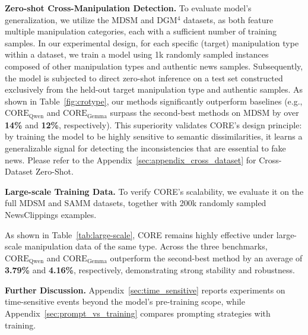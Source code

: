 \documentclass{article}
\theoremstyle{plain}
\theoremstyle{definition}
\theoremstyle{remark}
\begin{document}
\noindent\textbf{Zero-shot Cross-Manipulation Detection.} 
To evaluate model's generalization, we utilize the MDSM and DGM$^4$ datasets, as both feature multiple manipulation categories, each with a sufficient number of training samples. In our experimental design, for each specific (target) manipulation type within a dataset, we train a model using 1k randomly sampled instances composed of other manipulation types and authentic news samples. Subsequently, the model is subjected to direct zero-shot inference on a test set constructed exclusively from the held-out target manipulation type and authentic samples. As shown in Table~\ref{fig:crotype}, our methods significantly outperform baselines (e.g., $\text{CORE}_\text{Qwen}$ and $\text{CORE}_\text{Gemma}$ surpass the second-best methods on MDSM by over \textbf{14\%} and \textbf{12\%}, respectively). This superiority validates CORE's design principle: by training the model to be highly sensitive to semantic dissimilarities, it learns a generalizable signal for detecting the inconsistencies that are essential to fake news. Please refer to the Appendix~\ref{sec:appendix_cross_dataset} for Cross-Dataset Zero-Shot.

\noindent\textbf{Large-scale Training Data.}
To verify CORE's scalability, we evaluate it on the full MDSM and SAMM datasets, together with 200k randomly sampled NewsClippings examples.

As shown in Table~\ref{tab:large-scale}, CORE remains highly effective under large-scale manipulation data of the same type. Across the three benchmarks, $\text{CORE}_\text{Qwen}$ and $\text{CORE}_\text{Gemma}$ outperform the second-best method by an average of \textbf{3.79\%} and \textbf{4.16\%}, respectively, demonstrating strong stability and robustness.

\noindent\textbf{Further Discussion.}
Appendix~\ref{sec:time_sensitive} reports experiments on time-sensitive events beyond the model's pre-training scope, while Appendix~\ref{sec:prompt_vs_training} compares prompting strategies with  training.
\end{document}

